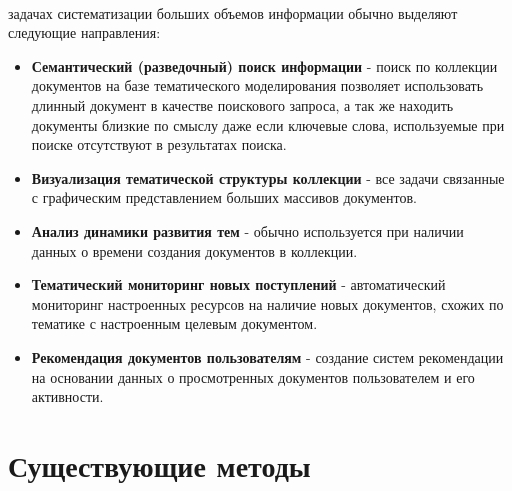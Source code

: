 ~\

 задачах систематизации больших объемов информации обычно выделяют следующие направления:

\begin{itemize}
    \item \textbf{Семантический (разведочный) поиск информации} - поиск по коллекции документов на базе тематического моделирования позволяет использовать длинный документ в качестве поискового запроса, а так же находить документы близкие по смыслу даже если ключевые слова, используемые при поиске отсутствуют в результатах поиска.
    \item \textbf{Визуализация тематической структуры коллекции} - все задачи связанные с графическим представлением больших массивов документов.
    \item \textbf{Анализ динамики развития тем} - обычно используется при наличии данных о времени создания документов в коллекции.
    \item \textbf{Тематический мониторинг новых поступлений} - автоматический мониторинг настроенных ресурсов на наличие новых документов, схожих по тематике с настроенным целевым документом.
    \item \textbf{Рекомендация документов пользователям} - создание систем рекомендации на основании данных о просмотренных документов пользователем и его активности.
\end{itemize}

%
\section{Существующие методы}

